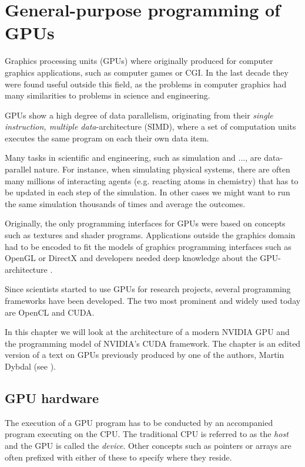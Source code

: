 \chapter{General-purpose programming of GPUs}
\label{chap:gpgpu}
Graphics processing units (GPUs) where originally produced for
computer graphics applications, such as computer games or CGI. In the
last decade they were found useful outside this field, as the problems
in computer graphics had many similarities to problems in science and
engineering.

GPUs show a high degree of data parallelism, originating from their
\textit{single instruction, multiple data}-architecture (SIMD), where
a set of computation units executes the same program on each their own
data item.

Many tasks in scientific and engineering, such as simulation and ...,
are data-parallel nature. For instance, when simulating physical
systems, there are often many millions of interacting agents
(e.g. reacting atoms in chemistry) that has to be updated in each step
of the simulation. In other cases we might want to run the same
simulation thousands of times and average the outcomes.

Originally, the only programming interfaces for GPUs were based on
concepts such as textures and shader programs. Applications outside
the graphics domain had to be encoded to fit the models of graphics
programming interfaces such as OpenGL or DirectX and developers needed
deep knowledge about the GPU-architecture
\cite{nvidia2009fermi}. 

Since scientists started to use GPUs for research projects, several
programming frameworks have been developed. The two most prominent and
widely used today are OpenCL and CUDA.

In this chapter we will look at the architecture of a modern NVIDIA
GPU and the programming model of NVIDIA's CUDA framework. The chapter
is an edited version of a text on GPUs previously produced by one of
the authors, Martin Dybdal (see \cite{dybdal2011opencl}).

\section{GPU hardware}
\label{sec:gpu_hardware}
The execution of a GPU program has to be conducted by an accompanied
program executing on the CPU. The traditional CPU is referred to as
the \textit{host} and the GPU is called the \textit{device}. Other
concepts such as pointers or arrays are often prefixed with either of
these to specify where they reside.

